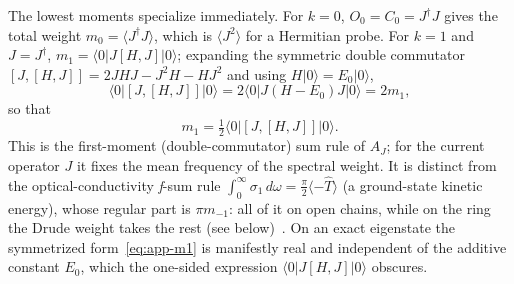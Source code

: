 \documentclass[submission, PhysCore]{SciPost}
\begin{document}
\begin{appendix}
The lowest moments specialize immediately. For $k=0$, $O_0=C_0=J^\dagger J$ gives the total weight $m_0=\langle J^\dagger J\rangle$, which is $\langle J^2\rangle$ for a Hermitian probe. For $k=1$ and $J=J^\dagger$, ${m_1=\langle 0|J[H,J]|0\rangle}$; expanding the symmetric double commutator ${[J,[H,J]]}$\allowbreak${{}=2JHJ-J^2H-HJ^2}$ and using $H|0\rangle=E_0|0\rangle$,
\begin{equation}
\langle 0|[J,[H,J]]|0\rangle=2\langle 0|J(H-E_0)J|0\rangle=2m_1,
\end{equation}
so that
\begin{equation}
m_1=\tfrac{1}{2}\langle 0|[J,[H,J]]|0\rangle .
\label{eq:app-m1}
\end{equation}
This is the first-moment (double-commutator) sum rule of $A_J$; for the current operator $J$ it fixes the mean frequency of the spectral weight. It is distinct from the optical-conductivity \textit{f}-sum rule $\int_0^\infty\sigma_1\,d\omega=\tfrac{\pi}{2}\langle-\hat T\rangle$ (a ground-state kinetic energy), whose regular part is $\pi m_{-1}$: all of it on open chains, while on the ring the Drude weight takes the rest (see below)~\cite{Kohn1964,Maldague1977,HohenbergMartin1965}. On an exact eigenstate the symmetrized form~\eqref{eq:app-m1} is manifestly real and independent of the additive constant $E_0$, which the one-sided expression $\langle 0|J[H,J]|0\rangle$ obscures.


\end{appendix}
\end{document}
